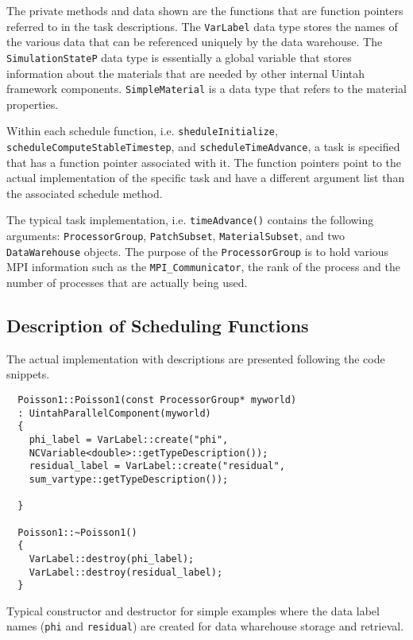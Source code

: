 \documentclass[11pt,fleqn]{book} %
\begin{document}
The private methods and data shown are the functions that are function
pointers referred to in the task descriptions.  The \texttt{VarLabel}
data type stores the names of the various data that can be referenced
uniquely by the data warehouse.  The \texttt{SimulationStateP} data
type is essentially a global variable that stores information about
the materials that are needed by other internal Uintah framework
components.  \texttt{SimpleMaterial} is a data type that refers to the
material properties.

Within each schedule function, i.e. \texttt{sheduleInitialize},
\texttt{scheduleComputeStableTimestep}, and
\texttt{scheduleTimeAdvance}, a task is specified that has a function
pointer associated with it.  The function pointers point to the actual
implementation of the specific task and have a different argument list
than the associated schedule method.

The typical task implementation, i.e. \texttt{timeAdvance()} contains
the following arguments: \texttt{ProcessorGroup},
\texttt{PatchSubset}, \texttt{MaterialSubset}, and two
\texttt{DataWarehouse} objects.  The purpose of the
\texttt{ProcessorGroup} is to hold various MPI information such as the
\texttt{MPI\_Communicator}, the rank of the process and the number of
processes that are actually being used.

\subsection{Description of Scheduling Functions}

The actual implementation with descriptions are presented following
the code snippets.

\begin{lstlisting}
  Poisson1::Poisson1(const ProcessorGroup* myworld)
  : UintahParallelComponent(myworld)
  {
    phi_label = VarLabel::create("phi", 
    NCVariable<double>::getTypeDescription());
    residual_label = VarLabel::create("residual", 
    sum_vartype::getTypeDescription());

  }

  Poisson1::~Poisson1()
  {
    VarLabel::destroy(phi_label);
    VarLabel::destroy(residual_label);
  }

\end{lstlisting}

Typical constructor and destructor for simple examples where the data
label names (\texttt{phi} and \texttt{residual}) are created for data
wharehouse storage and retrieval.
\end{document}

